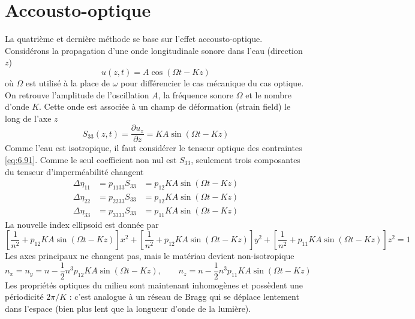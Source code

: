 \section{Accousto-optique}
La quatrième et dernière méthode se base sur l'effet accousto-optique. Considérons la propagation d'une onde 
longitudinale sonore dans l'eau (direction $z$)
\begin{equation}
u(z,t) = A\cos(\Omega t-Kz)
\end{equation}
où $\Omega$ est utilisé à la place de $\omega$ pour différencier le cas mécanique du cas optique. On retrouve
l'amplitude de l'oscillation $A$, la fréquence sonore $\Omega$ et le nombre d'onde $K$. Cette onde est 
associée à un champ de déformation (strain field) le long de l'axe $z$
\begin{equation}
S_{33}(z,t) = \dfrac{\partial u_z}{\partial z} = KA\sin(\Omega t-Kz)
\end{equation}
Comme l'eau est isotropique, il faut considérer le tenseur optique des contraintes \eqref{eq:6.91}. Comme le
seul coefficient non nul est $S_{33}$, seulement trois composantes du tenseur d'imperméabilité changent
\begin{equation}
\begin{array}{lll}
\Delta \eta_{11} &= p_{1133}S_{33} &= p_{12}KA\sin(\Omega t-Kz)\\
 \Delta \eta_{22} &= p_{2233}S_{33} &= p_{12}KA\sin(\Omega t-Kz)\\
 \Delta \eta_{33} &= p_{3333}S_{33} &= p_{11}KA\sin(\Omega t-Kz)
\end{array}
\end{equation}
La nouvelle index ellipsoid est donnée par
\begin{equation}
\left[\frac{1}{n^2}+p_{12}KA\sin(\Omega t-Kz)\right]x^2+
\left[\frac{1}{n^2}+p_{12}KA\sin(\Omega t-Kz)\right]y^2+
\left[\frac{1}{n^2}+p_{11}KA\sin(\Omega t-Kz)\right]z^2=1
\end{equation}
Les axes principaux ne changent pas, mais le matériau devient non-isotropique
\begin{equation}
n_x=n_y = n-\frac{1}{2}n^3p_{12}KA\sin(\Omega t-Kz),\qquad
n_z = n-\frac{1}{2}n^3p_{11}KA\sin(\Omega t-Kz)
\end{equation}
Les propriétés optiques du milieu sont maintenant inhomogènes et possèdent une périodicité $2\pi/K$ : c'est
analogue à un réseau de Bragg qui se déplace lentement dans l'espace (bien plus lent que la longueur d'onde
de la lumière). \\

